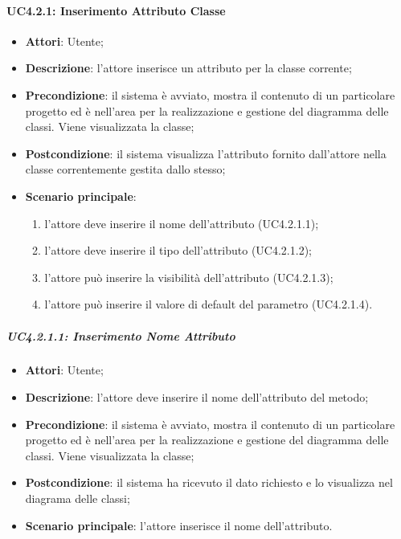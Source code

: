 \paragraph{UC4.2.1: Inserimento Attributo Classe}
\label{UC4.2.1}
\begin{itemize}
	\item \textbf{Attori}: Utente;
	\item \textbf{Descrizione}: l'attore inserisce un attributo per la classe corrente;
	\item \textbf{Precondizione}:  il sistema è avviato, mostra il contenuto di un particolare progetto ed è nell'area per la realizzazione e gestione del diagramma delle classi. Viene visualizzata la classe;
	\item \textbf{Postcondizione}: il sistema visualizza l'attributo fornito dall'attore nella classe correntemente gestita dallo stesso;
	\item \textbf{Scenario principale}:
	\begin{enumerate}
		\item l'attore deve inserire il nome dell'attributo (UC4.2.1.1);
		\item l'attore deve inserire il tipo dell'attributo (UC4.2.1.2);
		\item l'attore può inserire la visibilità dell'attributo (UC4.2.1.3);
		\item l'attore può inserire il valore di default del parametro (UC4.2.1.4).
	\end{enumerate}
\end{itemize}

\subparagraph{UC4.2.1.1: Inserimento Nome Attributo}
\label{UC4.2.1.1}
\begin{itemize}
	\item \textbf{Attori}: Utente;
	\item \textbf{Descrizione}: l'attore deve inserire il nome dell'attributo del metodo;
	\item \textbf{Precondizione}: il sistema è avviato, mostra il contenuto di un particolare progetto ed è nell'area per la realizzazione e gestione del diagramma delle classi. Viene visualizzata la classe;
	\item \textbf{Postcondizione}: il sistema ha ricevuto il dato richiesto e lo visualizza nel diagrama delle classi;
	\item \textbf{Scenario principale}: l'attore inserisce il nome dell'attributo.
\end{itemize}

